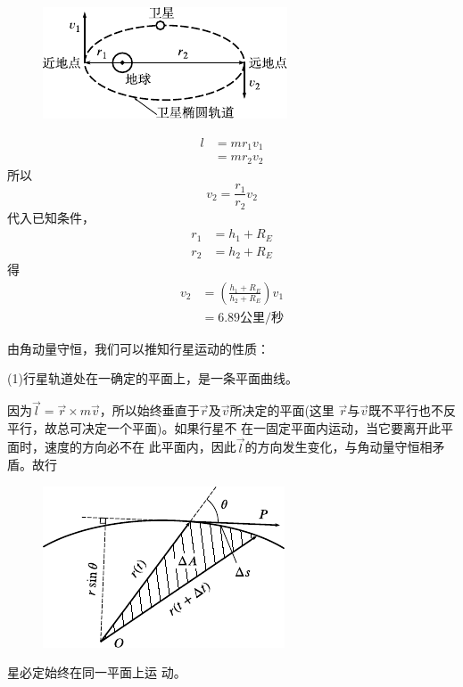 \begin{figure}
  \centering
  \includegraphics{figure/fig09.03}
  \caption{}
  \label{fig:09.03}
\end{figure}
\mbox{}\vspace{-1em}\begin{equation*}
  \begin{split}
    l &= m r _ { 1 } v _ { 1 }  \\
    &= m r _ { 2 } v _ { 2 }
  \end{split}
\end{equation*}
所以\vspace{-1.56em}
\begin{equation*}
  v _ { 2 } = \frac { r _ { 1 } } { r _ { 2 } } v _ { 2 }
\end{equation*}
代入已知条件，
\begin{equation*}
  \begin{split}
    r _ { 1 } &= h _ { 1 } + R _ { E } \\
    r _ { 2 } &= h _ { 2 } + R _ { E }
  \end{split}
\end{equation*}
得\vspace{-1.56em}
\begin{equation*}
  \begin{split}
    v _ { 2 } &= \left( \frac { h _ { 1 } + R _ { E } } { h _ { 2 } + R _ { E } } \right) v _ { 1 } \\
    &= 6 . 8 9 \text{公里}/\text{秒}
  \end{split}
\end{equation*}

由角动量守恒，我们可以推知行星运动的性质：

(1)行星轨道处在一确定的平面上，是一条平面曲线。

因为$ \vec{l} = \vec{r} \times m \vec{v} $，所以始终垂直于$ \vec{r} $及$ \vec{v} $所决定的平面(这里
$ \vec{r} $与$ \vec{v} $既不平行也不反平行，故总可决定一个平面)。如果行星不
在一固定平面内运动，当它要离开此平面时，速度的方向必不在
此平面内，因此$\vec{l}$的方向发生变化，与角动量守恒相矛盾。故行
\begin{figure}
  \centering
  \includegraphics{figure/fig09.04}
  \caption{}
  \label{fig:09.04}
\end{figure}
星必定始终在同一平面上运
动。

